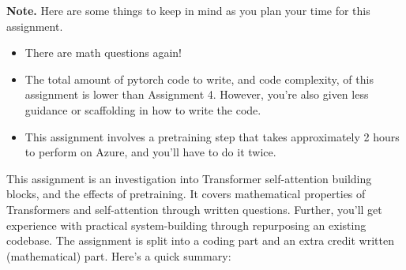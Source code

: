 \begin{framed}
\noindent
 \textbf{Note.} Here are some things to keep in mind as you plan your time for this assignment.
\begin{itemize}
   \item There are math questions again!
   \item The total amount of pytorch code to write, and code complexity, of this assignment is lower than Assignment 4. 
         However, you're also given less guidance or scaffolding in how to write the code.
         \item  This assignment involves a pretraining step that takes approximately 2 hours to perform on Azure, and you'll have to do it twice.
\end{itemize}
\end{framed}
This assignment is an investigation into Transformer self-attention building blocks, and the effects of pretraining.
It covers mathematical properties of Transformers and self-attention through written questions.
Further, you'll get experience with practical system-building through repurposing an existing codebase.
The assignment is split into a coding part and an extra credit written (mathematical) part.
Here's a quick summary:
